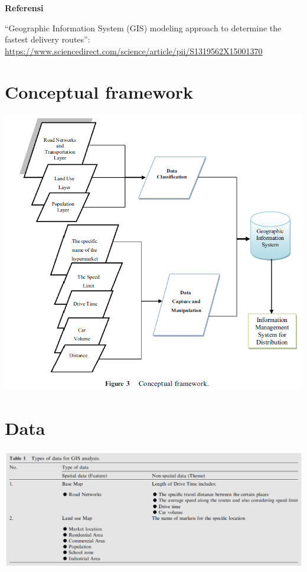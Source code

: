 \documentclass[]{book}
\begin{document}
\textbf{Referensi}

``Geographic Information System (GIS) modeling approach to determine the fastest delivery routes'': \url{https://www.sciencedirect.com/science/article/pii/S1319562X15001370}

\hypertarget{conceptual-framework}{%
\section{Conceptual framework}\label{conceptual-framework}}

\includegraphics{./img/gismodel1.png}

\hypertarget{data}{%
\section{Data}\label{data}}

\includegraphics{./img/gismodel2.png}
\end{document}
